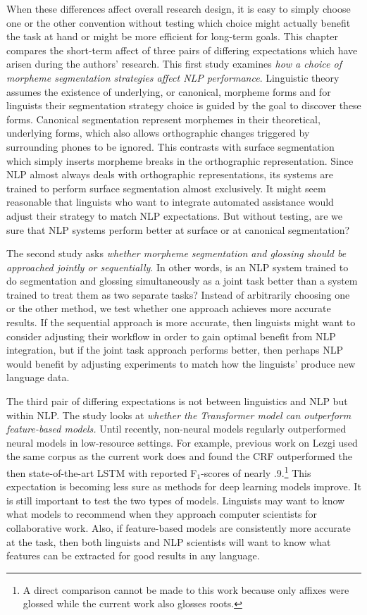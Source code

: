 When these differences affect overall research design, it is easy to simply choose one or the other convention without testing which choice might actually benefit the task at hand or might be more efficient for long-term goals. This chapter compares the short-term affect of three pairs of differing expectations which have arisen during the authors' research. 
This first study examines \textit{how a choice of morpheme segmentation strategies affect NLP performance}. Linguistic theory assumes the existence of underlying, or canonical, morpheme forms and for linguists their segmentation strategy choice is guided by the goal to discover these forms. Canonical segmentation represent morphemes in their theoretical, underlying forms, which also allows orthographic changes triggered by surrounding phones to be ignored. This contrasts with surface segmentation which simply inserts morpheme breaks in the orthographic representation. Since NLP almost always deals with orthographic representations, its systems are trained to perform surface segmentation almost exclusively. 
It might seem reasonable that linguists who want to integrate automated assistance would adjust their strategy to match NLP expectations. But without testing, are we sure that NLP systems perform better at surface or at canonical segmentation?


The second study asks \textit{whether morpheme segmentation and glossing should be approached jointly or sequentially}. In other words, is an NLP system trained to do segmentation and glossing simultaneously as a joint task better than a system trained to treat them as two separate tasks? Instead of arbitrarily choosing one or the other method, we test whether one approach achieves more accurate results. If the sequential approach is more accurate, then linguists might want to consider adjusting their workflow in order to gain optimal benefit from NLP integration, but if the joint task approach performs better, then perhaps NLP would benefit by adjusting experiments to match how the linguists' produce new language data.

The third pair of differing expectations is not between linguistics and NLP but within NLP. The study looks at \textit{whether the Transformer model can outperform feature-based models.} Until recently, non-neural models regularly outperformed neural models in low-resource settings. For example, previous work on Lezgi \citep{moeller_automatic_2018} used the same corpus as the current work does and found the CRF outperformed the then state-of-the-art LSTM with reported F$_1$-scores of nearly .9.\footnote{A direct comparison cannot be made to this work because only affixes were glossed while the current work also glosses roots.} This expectation is becoming less sure as methods for deep learning models improve. It is still important to test the two types of models. Linguists may want to know what models to recommend when they approach computer scientists for collaborative work. Also, if feature-based models are consistently more accurate at the task, then both linguists and NLP scientists will want to know what features can be extracted for good results in any language. 

